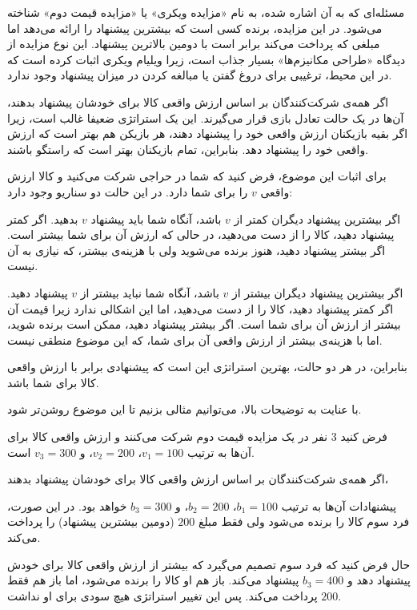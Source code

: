 مسئله‌ای که به آن اشاره شده، به نام «مزایده ویکری» یا «مزایده قیمت دوم» شناخته می‌شود. در این مزایده، برنده کسی است که بیشترین پیشنهاد را ارائه می‌دهد اما مبلغی که پرداخت می‌کند برابر است با دومین بالاترین پیشنهاد. این نوع مزایده از دیدگاه «طراحی مکانیزم‌ها» بسیار جذاب است، زیرا ویلیام ویکری اثبات کرده است که در این محیط، ترغیبی برای دروغ گفتن یا مبالغه کردن در میزان پیشنهاد وجود ندارد.

اگر همه‌ی شرکت‌کنندگان بر اساس ارزش واقعی کالا برای خودشان پیشنهاد بدهند، آن‌ها در یک حالت تعادل بازی قرار می‌گیرند. این یک استراتژی ضعیفا غالب است، زیرا اگر بقیه بازیکنان ارزش واقعی خود را پیشنهاد دهند، هر بازیکن هم بهتر است که ارزش واقعی خود را پیشنهاد دهد. بنابراین، تمام بازیکنان بهتر است که راستگو باشند.

برای اثبات این موضوع، فرض کنید که شما در حراجی شرکت می‌کنید و کالا ارزش واقعی $v$ را برای شما دارد. در این حالت دو سناریو وجود دارد:

اگر بیشترین پیشنهاد دیگران کمتر از $v$ باشد، آنگاه شما باید پیشنهاد $v$ بدهید. اگر کمتر پیشنهاد دهید، کالا را از دست می‌دهید، در حالی که ارزش آن برای شما بیشتر است. اگر بیشتر پیشنهاد دهید، هنوز برنده می‌شوید ولی با هزینه‌ی بیشتر، که نیازی به آن نیست.

اگر بیشترین پیشنهاد دیگران بیشتر از $v$ باشد، آنگاه شما نباید بیشتر از $v$ پیشنهاد دهید. اگر کمتر پیشنهاد دهید، کالا را از دست می‌دهید، اما این اشکالی ندارد زیرا قیمت آن بیشتر از ارزش آن برای شما است. اگر بیشتر پیشنهاد دهید، ممکن است برنده شوید، اما با هزینه‌ی بیشتر از ارزش واقعی آن برای شما، که این موضوع منطقی نیست.

بنابراین، در هر دو حالت، بهترین استراتژی این است که پیشنهادی برابر با ارزش واقعی کالا برای شما باشد.

با عنایت به توضیحات بالا، می‌توانیم مثالی بزنیم تا این موضوع روشن‌تر شود.

فرض کنید 3 نفر در یک مزایده قیمت دوم شرکت می‌کنند و ارزش واقعی کالا برای آن‌ها به ترتیب $v_1=100$، $v_2=200$، و $v_3=300$ است.

اگر همه‌ی شرکت‌کنندگان بر اساس ارزش واقعی کالا برای خودشان پیشنهاد بدهند، 


پیشنهادات آن‌ها به ترتیب $b_1=100$، $b_2=200$، و $b_3=300$ خواهد بود. در این صورت، فرد سوم کالا را برنده می‌شود ولی فقط مبلغ $200$ (دومین بیشترین پیشنهاد) را پرداخت می‌کند.

حال فرض کنید که فرد سوم تصمیم می‌گیرد که بیشتر از ارزش واقعی کالا برای خودش پیشنهاد دهد و $b_3=400$ پیشنهاد می‌کند. باز هم او کالا را برنده می‌شود، اما باز هم فقط $200$ پرداخت می‌کند. پس این تغییر استراتژی هیچ سودی برای او نداشت.

